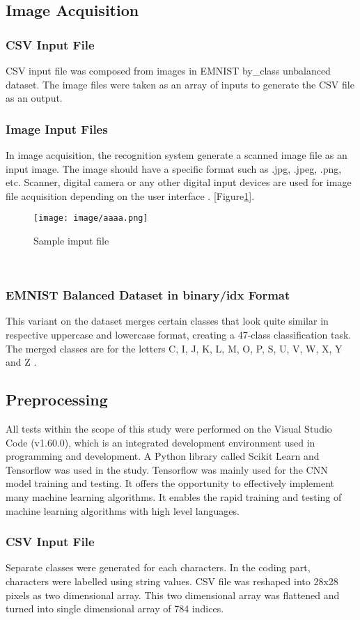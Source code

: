 \documentclass[conference]{IEEEtran}
\begin{document}
\subsection{Image Acquisition}
\subsubsection{CSV Input File}
CSV input file was composed from images in EMNIST by\_class unbalanced dataset. The image files were taken as an array of inputs to generate the CSV file as an output.
\subsubsection{Image Input Files}
In image acquisition, the recognition system generate a 
scanned image file as an input image. The image should have 
a specific format such as .jpg, .jpeg, .png, etc. Scanner, digital camera or any other digital input devices are used for image file acquisition depending on the user interface \cite{Sahu2017}.  [Figure\ref{aa}].
\begin{figure}[htp]
    \centering
    \texttt{[image: image/aaaa.png]}
    \caption{Sample imput file}
    \label{aa}
\end{figure}\\
\subsubsection{EMNIST Balanced Dataset in binary/idx Format}
This variant
on the dataset merges certain classes that look quite similar in respective uppercase and lowercase format, creating a 47-class
classification task. The merged classes are for the letters C, I, J, K, L, M, O, P, S, U, V, W, X, Y and Z \cite{Gutierrez}.
\subsection{Preprocessing}
All tests within the scope of this study were 
performed on the Visual Studio Code (v1.60.0), which is an integrated development environment used in programming and development. A Python library called Scikit Learn and Tensorflow was used in the study. Tensorflow was mainly used for the CNN model training and testing. It offers the opportunity to effectively implement many 
machine learning algorithms. It enables the rapid 
training and testing of machine learning 
algorithms with high level languages.
\subsubsection{CSV Input File}
Separate classes were generated for each characters. In the coding part, characters were labelled using string values. CSV file was reshaped into 28x28 pixels as two dimensional array. This two dimensional array was flattened and turned into single dimensional array of 784 indices.
\end{document}
